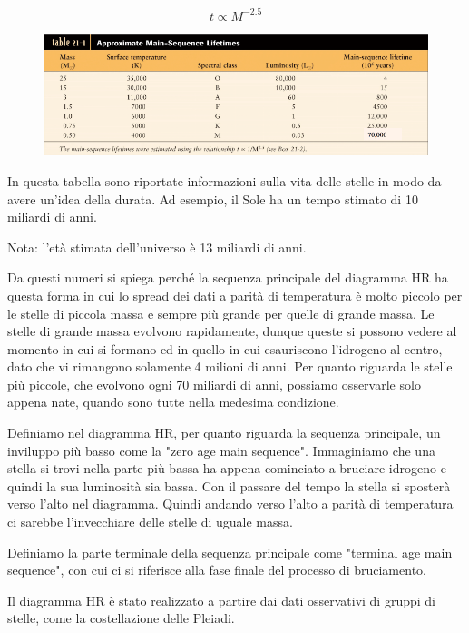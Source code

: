 $$t \propto M ^{-2.5}$$

\begin{figure}[H]
    \centering
    \includegraphics[width=16cm]{Durata di vita delle stelle.png}
    \label{fig:Durata di vita delle stelle.png}
\end{figure}

In questa tabella sono riportate informazioni sulla vita delle stelle in modo da avere un'idea della durata. Ad esempio, il Sole ha un tempo stimato di 10 miliardi di anni.

Nota: l'età stimata dell'universo è 13 miliardi di anni.

Da questi numeri si spiega perché la sequenza principale del diagramma HR ha questa forma in cui lo spread dei dati a parità di temperatura è molto piccolo per le stelle di piccola massa e sempre più grande per quelle di grande massa. Le stelle di grande massa evolvono rapidamente, dunque queste si possono vedere al momento in cui si formano ed in quello in cui esauriscono l'idrogeno al centro, dato che vi rimangono solamente 4 milioni di anni. Per quanto riguarda le stelle più piccole, che evolvono ogni 70 miliardi di anni, possiamo osservarle solo appena nate, quando sono tutte nella medesima condizione.


Definiamo nel diagramma HR, per quanto riguarda la sequenza principale, un inviluppo più basso come la "zero age main sequence". Immaginiamo che una stella si trovi nella parte più bassa ha appena cominciato a bruciare idrogeno e quindi la sua luminosità sia bassa. Con il passare del tempo la stella si sposterà verso l'alto nel diagramma. Quindi andando verso l'alto a parità di temperatura ci sarebbe l'invecchiare delle stelle di uguale massa.

Definiamo la parte terminale della sequenza principale come "terminal age main sequence", con cui ci si riferisce alla fase finale del processo di bruciamento.

Il diagramma HR è stato realizzato a partire dai dati osservativi di gruppi di stelle, come la costellazione delle Pleiadi.

